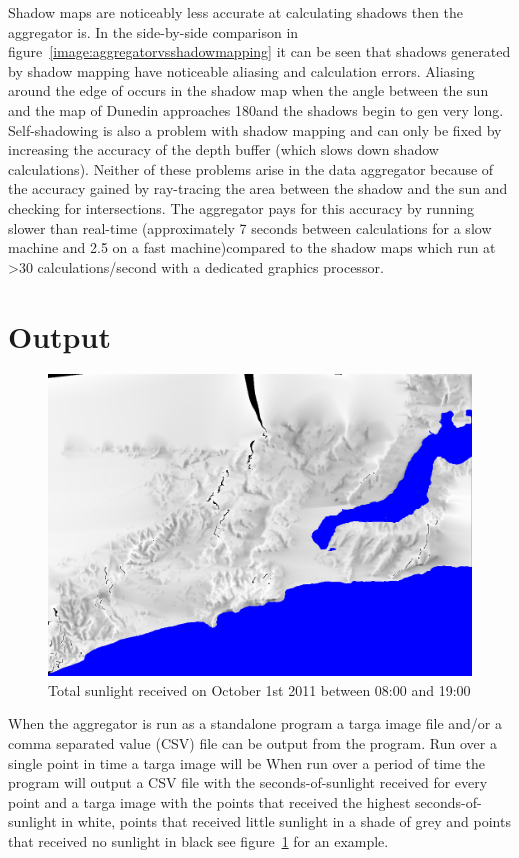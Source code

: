 \documentclass[12pt]{report}
\begin{document}
Shadow maps are noticeably less accurate at calculating shadows then the aggregator is. In the side-by-side comparison in figure~\ref{image:aggregatorvsshadowmapping} it can be seen that shadows generated by shadow mapping have noticeable aliasing and calculation errors. Aliasing around the edge of occurs in the shadow map when the angle between the sun and the map of Dunedin approaches 180\degree and the shadows begin to gen very long. Self-shadowing is also a problem with shadow mapping and can only be fixed by increasing the accuracy of the depth buffer (which slows down shadow calculations). Neither of these problems arise in the data aggregator because of the accuracy gained by ray-tracing the area between the shadow and the sun and checking for intersections. The aggregator pays for this accuracy by running slower than real-time (approximately 7 seconds between calculations for a slow machine and 2.5 on a fast machine)compared to the shadow maps which run at >30 calculations/second with a dedicated graphics processor.\\

\section{Output}%

\begin{figure}[h]
\centering
\includegraphics[scale=0.25]{october1st.png}
\caption{Total sunlight received on October 1st 2011 between 08:00 and 19:00}
\label{image:aggregator-targa-output}
\end{figure}

When the aggregator is run as a standalone program a targa image file and/or a comma separated value (CSV) file can be output from the program. Run over a single point in time a targa image will be 
When run over a period of time the program will output a CSV file with the seconds-of-sunlight received for every point and a targa image with the points that received the highest seconds-of-sunlight in white, points that received little sunlight in a shade of grey and points that received no sunlight in black see figure~\ref{image:aggregator-targa-output} for an example.\\
\end{document}
